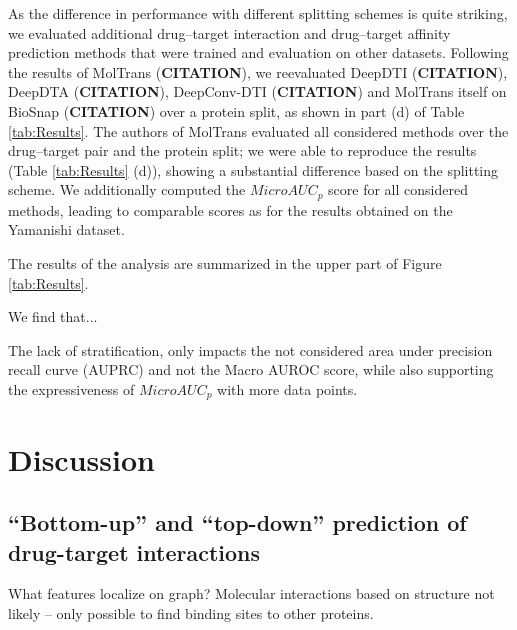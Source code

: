 \documentclass{bioinfo}
\begin{document}
As the difference in performance with different splitting schemes is
quite striking, we evaluated additional drug--target interaction and
drug--target affinity prediction methods that were trained and
evaluation on other datasets.  Following the results of MolTrans
(\textbf{CITATION}), we reevaluated DeepDTI (\textbf{CITATION}),
DeepDTA (\textbf{CITATION}), DeepConv-DTI (\textbf{CITATION}) and
MolTrans itself on BioSnap
(\textbf{CITATION}) over a protein split, as shown in part (d) of
Table \ref{tab:Results}. The authors of MolTrans evaluated all
considered methods over the drug--target pair and the protein split;
we were able to reproduce the results (Table \ref{tab:Results} (d)),
showing a substantial difference based on the splitting scheme. We
additionally computed the $MicroAUC_p$ score for all considered
methods, leading to comparable
scores as for the results obtained on the Yamanishi dataset.

The results of the analysis are summarized in the upper part of Figure
\ref{tab:Results}.

We find that...



The lack of stratification, only impacts the not
considered area under precision recall curve (AUPRC) and not the Macro
AUROC score, while also supporting the expressiveness of $MicroAUC_p$
with more data points.





\section{Discussion}

\subsection{``Bottom-up'' and ``top-down'' prediction of drug-target interactions}

What features localize on graph? Molecular interactions based on
structure not likely -- only possible to find binding sites to other
proteins.
\end{document}
